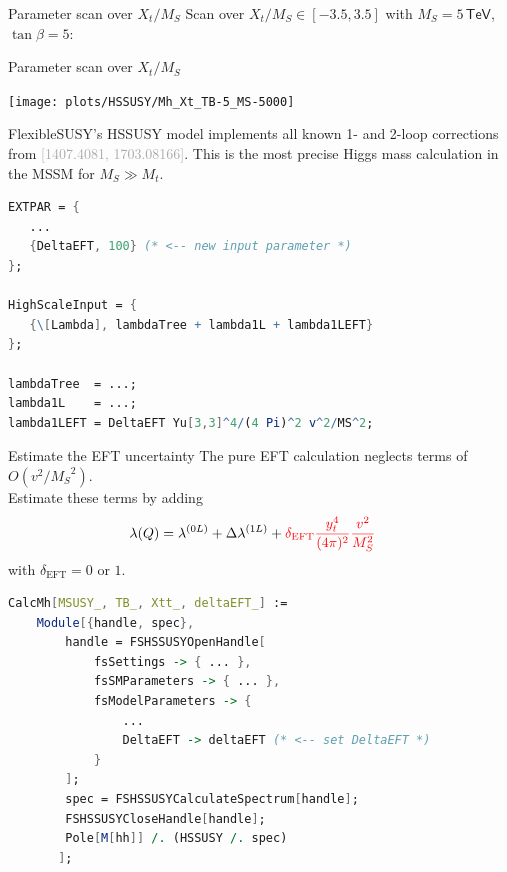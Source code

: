 \documentclass[hyperref={pdfpagelabels=false},ngerman]{beamer}
\newcommand{\eh}[1]{\,\mathsf{#1}}
\newcommand{\MS}{\ensuremath{M_S}}
\newcommand{\bigcite}[1]{\textcolor{darkgray}{[#1]}}
\begin{document}
\begin{frame}{Parameter scan over $X_t/\MS$}
  Scan over $X_t/\MS \in [-3.5, 3.5]$ with $\MS = 5\eh{TeV}$, $\tan\beta = 5$:\\[2em]
  \usebox{\listbox}
\end{frame}

\begin{frame}{Parameter scan over $X_t/\MS$}
  \begin{center}
    \texttt{[image: plots/HSSUSY/Mh\_Xt\_TB-5\_MS-5000]}
  \end{center}
  FlexibleSUSY's HSSUSY model implements all known 1- and 2-loop
  corrections from \bigcite{1407.4081, 1703.08166}.  This is the most
  precise Higgs mass calculation in the MSSM for $\MS \gg M_t$.
\end{frame}

\begin{lrbox}{\listbox}\begin{lstlisting}[language=Mathematica]
EXTPAR = {
   ...
   {DeltaEFT, 100} (* <-- new input parameter *)
};

HighScaleInput = {
   {\[Lambda], lambdaTree + lambda1L + lambda1LEFT}
};

lambdaTree  = ...;
lambda1L    = ...;
lambda1LEFT = DeltaEFT Yu[3,3]^4/(4 Pi)^2 v^2/MS^2;
\end{lstlisting}\end{lrbox} %

\begin{frame}{Estimate the EFT uncertainty}
  The pure EFT calculation neglects terms of $O(v^2/\MS^2)$.\\
  Estimate these terms by adding
  \begin{align*}
    \lambda(Q) &= \lambda^{(0L)} + \Delta\lambda^{(1L)}
    + \textcolor{red}{\delta_\text{EFT} \frac{y_t^4}{(4\pi)^2} \frac{v^2}{\MS^2}}
  \end{align*}
  with $\delta_\text{EFT} = 0$ or $1$.\\[1em]
  \usebox{\listbox}
\end{frame}

\begin{lrbox}{\listbox}\begin{lstlisting}[language=Mathematica]
CalcMh[MSUSY_, TB_, Xtt_, deltaEFT_] :=
    Module[{handle, spec},
        handle = FSHSSUSYOpenHandle[
            fsSettings -> { ... },
            fsSMParameters -> { ... },
            fsModelParameters -> {
                ...
                DeltaEFT -> deltaEFT (* <-- set DeltaEFT *)
            }
        ];
        spec = FSHSSUSYCalculateSpectrum[handle];
        FSHSSUSYCloseHandle[handle];
        Pole[M[hh]] /. (HSSUSY /. spec)
       ];
\end{lstlisting}\end{lrbox} %
\end{document}
